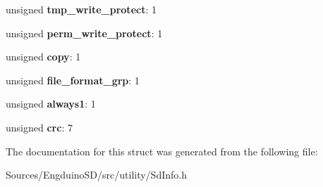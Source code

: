 \begin{DoxyCompactItemize}
\item 
\hypertarget{struct_c_s_d_v2_a15af35048d759ff86290222b7ce8e217}{}unsigned {\bfseries tmp\+\_\+write\+\_\+protect}\+: 1\label{struct_c_s_d_v2_a15af35048d759ff86290222b7ce8e217}

\item 
\hypertarget{struct_c_s_d_v2_ae8a4cd07025c0192acc093cca8379d73}{}unsigned {\bfseries perm\+\_\+write\+\_\+protect}\+: 1\label{struct_c_s_d_v2_ae8a4cd07025c0192acc093cca8379d73}

\item 
\hypertarget{struct_c_s_d_v2_a94c3a6332d4905be59800fd59aafe5ff}{}unsigned {\bfseries copy}\+: 1\label{struct_c_s_d_v2_a94c3a6332d4905be59800fd59aafe5ff}

\item 
\hypertarget{struct_c_s_d_v2_a093e6982187fdc5ba9c787c014f6296c}{}unsigned {\bfseries file\+\_\+format\+\_\+grp}\+: 1\label{struct_c_s_d_v2_a093e6982187fdc5ba9c787c014f6296c}

\item 
\hypertarget{struct_c_s_d_v2_a3bcdd97582c0d282b5e4270def81f156}{}unsigned {\bfseries always1}\+: 1\label{struct_c_s_d_v2_a3bcdd97582c0d282b5e4270def81f156}

\item 
\hypertarget{struct_c_s_d_v2_a099f7c6b9acbfa6b733fe4ab94c10ccc}{}unsigned {\bfseries crc}\+: 7\label{struct_c_s_d_v2_a099f7c6b9acbfa6b733fe4ab94c10ccc}

\end{DoxyCompactItemize}


The documentation for this struct was generated from the following file\+:\begin{DoxyCompactItemize}
\item 
Sources/\+Engduino\+S\+D/src/utility/Sd\+Info.\+h\end{DoxyCompactItemize}
